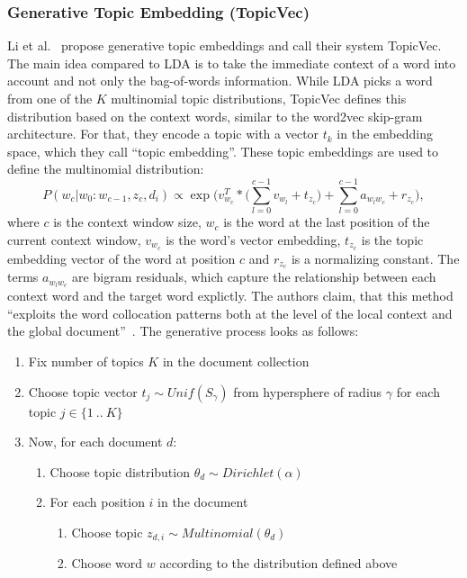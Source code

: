 \documentclass[
        a4paper,
        titlepage,
        twoside,
        parskip
        ]{scrbook}
\theoremstyle{break}
\begin{document}
\subsubsection{Generative Topic Embedding (TopicVec)}
Li et al.~\cite{Li2016} propose generative topic embeddings and call their system TopicVec.
The main idea compared to LDA is to take the immediate context of a word into account and not only the bag-of-words information.
While LDA picks a word from one of the $K$ multinomial topic distributions, TopicVec defines this distribution based on the context words, similar to the word2vec skip-gram architecture.
For that, they encode a topic with a vector $t_k$ in the embedding space, which they call ``topic embedding''.
These topic embeddings are used to define the multinomial distribution:
\begin{equation*}
  P(w_c | w_0 : w_{c - 1}, z_c, d_i) \propto \exp \bigg( v_{w_{c}}^T * \Big( \sum\limits_{l=0}^{c-1} v_{w_l} + t_{z_c} \Big) + \sum\limits_{l=0}^{c - 1} a_{w_{l} w_c}  + r_{z_c} \bigg),
\end{equation*}
where $c$ is the context window size, $w_c$ is the word at the last position of the current context window, $v_{w_c}$ is the word's vector embedding, $t_{z_c}$ is the topic embedding vector of the word at position $c$ and $r_{z_c}$ is a normalizing constant.
The terms $a_{w_l w_c}$ are bigram residuals, which capture the relationship between each context word and the target word explictly.
The authors claim, that this method ``exploits the word collocation patterns both at the level of the local context and the global document''~\cite{Li2016}.
The generative process looks as follows:
\begin{enumerate}
    \item Fix number of topics $K$ in the document collection
    \item Choose topic vector $t_j \sim Unif(S_{\gamma})$ from hypersphere of radius $\gamma$ for each topic $j \in \{1~..~K\}$
    \item Now, for each document $d$:
    \begin{enumerate}
        \item Choose topic distribution $\theta_d \sim Dirichlet(\alpha)$
        \item For each position $i$ in the document
        \begin{enumerate}
            \item Choose topic $z_{d,i} \sim Multinomial(\theta_d)$
            \item Choose word $w$ according to the distribution defined above
        \end{enumerate}
    \end{enumerate}
\end{enumerate}
\end{document}
